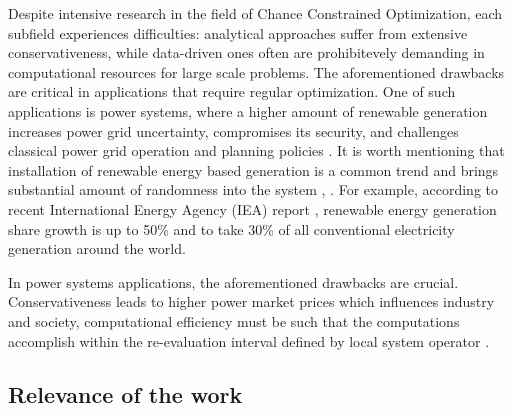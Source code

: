 Despite intensive research in the field of Chance Constrained Optimization, each subfield experiences difficulties: analytical approaches suffer from extensive conservativeness, while data-driven ones often are prohibitevely demanding in computational resources for large scale problems. The aforementioned drawbacks are critical in applications that require regular optimization. 
One of such applications is power systems, where a higher amount of renewable generation increases power grid uncertainty, compromises its security, and challenges classical power grid operation and planning policies \cite{koutsoyiannis2016unavoidable}. It is worth mentioning that installation of renewable energy based generation is a common trend and brings substantial amount of randomness into the system \cite{koutsoyiannis2016unavoidable}, \cite{harjanne2019abandoning}. For example, according to recent International Energy Agency (IEA) report \cite{iea2024electricity}, renewable energy generation share growth is up to 50\% and to take 30\% of all conventional electricity generation around the world. 

In power systems applications, the aforementioned drawbacks are crucial. Conservativeness leads to higher power market prices which influences industry and society, computational efficiency must be such that the computations accomplish within the re-evaluation interval defined by local system operator \cite{chen2008probabilistic, koutsoyiannis2016unavoidable, stott2012optimal}.




\subsection*{Relevance of the work}


